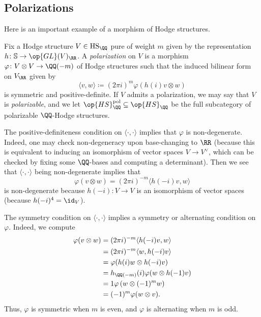 \documentclass[../thesis.tex]{subfiles}
\begin{document}

\subsection{Polarizations}
Here is an important example of a morphism of Hodge structures.
\begin{definition}[polarization] \label{def:polarization}
	Fix a Hodge structure $V\in\mathrm{HS}_\QQ$ pure of weight $m$ given by the representation $h\colon\mathbb S\to\op{GL}(V)_\RR$. A \textit{polarization} on $V$ is a morphism $\varphi\colon V\otimes V\to\QQ(-m)$ of Hodge structures such that the induced bilinear form on $V_\RR$ given by
	\[\langle v,w\rangle\coloneqq(2\pi i)^m\varphi(h(i)v\otimes w)\]
	is symmetric and positive-definite. If $V$ admits a polarization, we may say that $V$ is \textit{polarizable}, and we let $\op{HS}_\QQ^{\mathrm{pol}}\subseteq\op{HS}_\QQ$ be the full subcategory of polarizable $\QQ$-Hodge structures.
\end{definition}
\begin{remark} \label{rem:polarization-non-degenerate}
	The positive-definiteness condition on $\langle\cdot,\cdot\rangle$ implies that $\varphi$ is non-degenerate. Indeed, one may check non-degeneracy upon base-changing to $\RR$ (because this is equivalent to inducing an isomorphism of vector spaces $V\to V^\lor$, which can be checked by fixing some $\QQ$-bases and computing a determinant). Then we see that $\langle\cdot,\cdot\rangle$ being non-degenerate implies that
	\[\varphi(v\otimes w)=(2\pi i)^{-m}\langle h(-i)v,w\rangle\]
	is non-degenerate because $h(-i)\colon V\to V$ is an isomorphism of vector spaces (because $h(-i)^4=\id_V$).
\end{remark}
\begin{remark}
	The symmetry condition on $\langle\cdot,\cdot\rangle$ implies a symmetry or alternating condition on $\varphi$. Indeed, we compute
	\begin{align*}
		\varphi(v\otimes w) &= (2\pi i)^{-m}\langle h(-i)v,w\rangle \\
		&= (2\pi i)^{-m}\langle w,h(-i)v\rangle \\
		&= \varphi(h(i)w\otimes h(-i)v) \\
		&= h_{\QQ(-m)}(i)\varphi(w\otimes h(-1)v) \\
		&= 1\varphi\left(w\otimes(-1)^mw\right) \\
		&= (-1)^m\varphi(w\otimes v).
	\end{align*}
	Thus, $\varphi$ is symmetric when $m$ is even, and $\varphi$ is alternating when $m$ is odd.
\end{remark}
\end{document}
